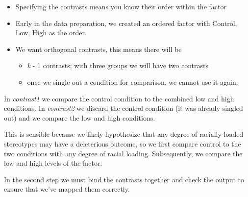 \documentclass[
  11pt,
]{book}
\newenvironment{Shaded}{\begin{snugshade}}{\end{snugshade}}
\newcommand{\CommentTok}[1]{\textcolor[rgb]{0.37,0.37,0.37}{\textit{#1}}}
\newcommand{\DecValTok}[1]{\textcolor[rgb]{0.06,0.06,0.06}{#1}}
\newcommand{\FunctionTok}[1]{\textcolor[rgb]{0.27,0.27,0.27}{\textbf{#1}}}
\newcommand{\NormalTok}[1]{#1}
\newcommand{\OtherTok}[1]{\textcolor[rgb]{0.37,0.37,0.37}{#1}}
\newcommand{\SpecialCharTok}[1]{\textcolor[rgb]{0.43,0.43,0.43}{\textbf{#1}}}
\providecommand{\tightlist}{%
  \setlength{\itemsep}{0pt}\setlength{\parskip}{0pt}}
\begin{document}
\begin{itemize}
\tightlist
\item
  Specifying the contrasts means you know their order within the factor
\item
  Early in the data preparation, we created an ordered factor with Control, Low, High as the order.
\item
  We want orthogonal contrasts, this means there will be

  \begin{itemize}
  \tightlist
  \item
    \emph{k} - 1 contrasts; with three groups we will have two contrasts
  \item
    once we single out a condition for comparison, we cannot use it again.
  \end{itemize}
\end{itemize}

In \emph{contrast1} we compare the control condition to the combined low and high conditions. In \emph{contrast2} we discard the control condition (it was already singled out) and we compare the low and high conditions.

This is sensible because we likely hypothesize that any degree of racially loaded stereotypes may have a deleterious outcome, so we first compare control to the two conditions with any degree of racial loading. Subsequently, we compare the low and high levels of the factor.

In the second step we must bind the contrasts together and check the output to ensure that we've mapped them correctly.

\begin{Shaded}
\end{Shaded}
\end{document}
